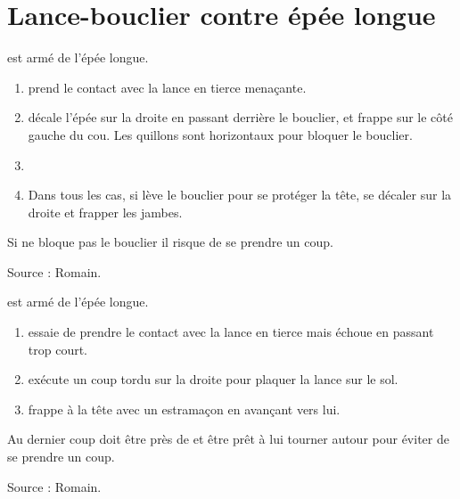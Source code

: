 \section{Lance-bouclier contre épée longue}


\begin{technique}

\A est armé de l'épée longue.

\begin{enumerate}
	\item \A prend le contact avec la lance en tierce menaçante.
	
	\item \A décale l'épée sur la droite en passant derrière le bouclier, et frappe sur le côté gauche du cou.
	Les quillons sont horizontaux pour bloquer le bouclier.
	
	\item {}
	
	\item Dans tous les cas, si \D lève le bouclier pour se protéger la tête, se décaler sur la droite et frapper les jambes.
\end{enumerate}

Si \A ne bloque pas le bouclier il risque de se prendre un coup.

Source : Romain.
\end{technique}



\begin{technique}

\A est armé de l'épée longue.

\begin{enumerate}
	\item \A essaie de prendre le contact avec la lance en tierce mais échoue en passant trop court.
	
	\item \A exécute un coup tordu sur la droite pour plaquer la lance sur le sol.
	
	\item \A frappe \D à la tête avec un estramaçon en avançant vers lui.
\end{enumerate}

Au dernier coup \A doit être près de \D et être prêt à lui tourner autour pour éviter de se prendre un coup.

Source : Romain.
\end{technique}
